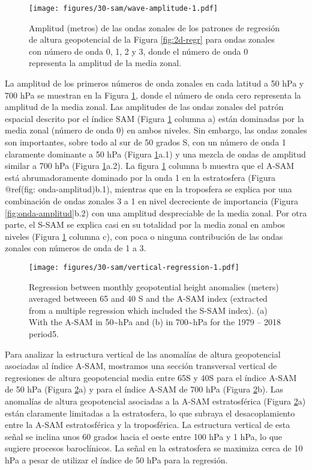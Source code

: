 \documentclass[12pt,oneside]{reedthesis}
\begin{document}
\begin{figure}
\centering
\texttt{[image: figures/30-sam/wave-amplitude-1.pdf]}
\caption{\label{fig:wave-amplitude}Amplitud (metros) de las ondas zonales de los patrones de regresión de altura geopotencial de la Figura \ref{fig:2d-regr} para ondas zonales con número de onda 0, 1, 2 y 3, donde el número de onda 0 representa la amplitud de la media zonal.}
\end{figure}
La amplitud de los primeros números de onda zonales en cada latitud a 50 hPa y 700 hPa se muestran en la Figura \ref{fig:wave-amplitude}, donde el número de onda cero representa la amplitud de la media zonal.
Las amplitudes de las ondas zonales del patrón espacial descrito por el índice SAM (Figura \ref{fig:wave-amplitude} columna a) están dominadas por la media zonal (número de onda 0) en ambos niveles.
Sin embargo, las ondas zonales son importantes, sobre todo al sur de 50 grados S, con un número de onda 1 claramente dominante a 50 hPa (Figura \ref{fig:wave-amplitude}a.1) y una mezcla de ondas de amplitud similar a 700 hPa (Figura \ref{fig:wave-amplitude}a.2).
La figura \ref{fig:wave-amplitude} columna b muestra que el A\nobreakdash-SAM está abrumadoramente dominado por la onda 1 en la estratosfera (Figura @ref(fig: onda-amplitud)b.1), mientras que en la troposfera se explica por una combinación de ondas zonales 3 a 1 en nivel decreciente de importancia (Figura \ref{fig:onda-amplitud}b.2) con una amplitud despreciable de la media zonal.
Por otra parte, el S\nobreakdash-SAM se explica casi en su totalidad por la media zonal en ambos niveles (Figura \ref{fig:wave-amplitude} columna c), con poca o ninguna contribución de las ondas zonales con números de onda de 1 a 3.
\begin{figure}
\centering
\texttt{[image: figures/30-sam/vertical-regression-1.pdf]}
\caption{\label{fig:vertical-regression}Regression between monthly geopotential height anomalies (meters) averaged betweeen 65 and 40 S and the A-SAM index (extracted from a multiple regression which included the S-SAM index). (a) With the A-SAM in 50\textasciitilde hPa and (b) in 700\textasciitilde hPa for the 1979 -- 2018 period5.}
\end{figure}
Para analizar la estructura vertical de las anomalías de altura geopotencial asociadas al índice A\nobreakdash-SAM, mostramos una sección transversal vertical de regresiones de altura geopotencial media entre 65\degree S y 40\degree S para el índice A\nobreakdash-SAM de 50 hPa (Figura \ref{fig:vertical-regression}a) y para el índice A\nobreakdash-SAM de 700 hPa (Figura \ref{fig:vertical-regression}b).
Las anomalías de altura geopotencial asociadas a la A\nobreakdash-SAM estratosférica (Figura \ref{fig:vertical-regression}a) están claramente limitadas a la estratosfera, lo que subraya el desacoplamiento entre la A\nobreakdash-SAM estratosférica y la troposférica.
La estructura vertical de esta señal se inclina unos 60 grados hacia el oeste entre 100 hPa y 1 hPa, lo que sugiere procesos baroclínicos.
La señal en la estratosfera se maximiza cerca de 10 hPa a pesar de utilizar el índice de 50 hPa para la regresión.
\end{document}
